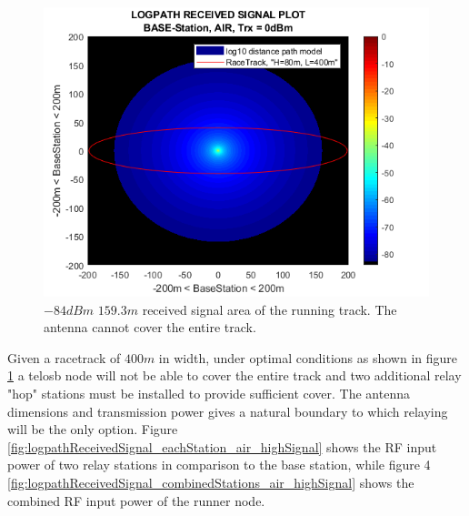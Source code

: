 \begin{figure}[h]
	\centering
	\includegraphics[width=\linewidth]{theory/pathLoss/fig/logpathReceivedSignal_baseStation_air_highSignal.png}
	\caption{$-84dBm$ $159.3m$ received signal area of the running track. The antenna cannot cover the entire track.}
	\label{fig:logpathReceivedSignal_baseStation_air_highSignal}
\end{figure}

\noindent Given a racetrack of $400m$ in width, under optimal conditions as shown in figure \ref{fig:logpathReceivedSignal_baseStation_air_highSignal} a telosb node will not be able to cover the entire track and two additional relay "hop" stations must be installed to provide sufficient cover. The antenna dimensions and transmission power gives a natural boundary to which relaying will be the only option. Figure \ref{fig:logpathReceivedSignal_eachStation_air_highSignal} shows the RF input power of two relay stations in comparison to the base station, while figure 4 \ref{fig:logpathReceivedSignal_combinedStations_air_highSignal} shows the combined RF input power of the runner node.

